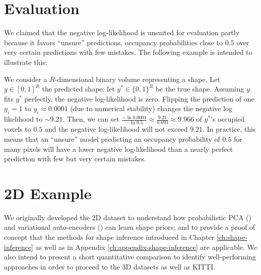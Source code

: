 \section{Evaluation}
\label{sec:appendix-experiments-evaluation}

We claimed that the negative log-likelihood is unsuited for evaluation
partly because it favors ``unsure'' predictions, \ie occupancy probabilities
close to $0.5$ over very certain predictions with few mistakes. The following
example is intended to illustrate this:

\begin{example}
  We consider a $R$-dimensional binary volume representing a shape. Let 
  $y \in [0,1]^R$ the predicted shape; let $y^* \in \{0,1\}^R$ be the true shape.
  Assuming $y$ fits $y^*$ perfectly, the negative log-likelihood is zero.
  Flipping the prediction of one $y_i = 1$ to $y_i \approx 0.0001$ (due to
  numerical stability) changes the negative log likelihood to $\sim 9.21$.
  Then, we can set
  $\frac{-\ln 0.0001}{- \ln 0.5} \approx \frac{9.21}{0.693} \approx 9.966$
  of $y^*$'s occupied voxels to $0.5$ and the negative log-likelihood will not exceed $9.21$.
  In practice, this means that an ``unsure'' model predicting an occupancy probability
  of $0.5$ for many pixels will have a lower negative log-likelihood
  than a nearly perfect prediction with few but very certain mistakes.
\end{example}

\section{2D Example}
\label{sec:appendix-experiments-2d}

We originally developed the 2D dataset to understand how probabilistic PCA (\PPCA) and variational
auto-encoders (\VAEs) can learn shape priors; and to provide a proof of concept
that the methods for shape inference introduced in Chapter \ref{ch:shape-inference}
as well as in Appendix \ref{ch:appendix-shape-inference}
are applicable. We also intend to present a short quantitative comparison to
identify well-performing approaches in order to proceed to the 3D datasets as 
well as KITTI.

